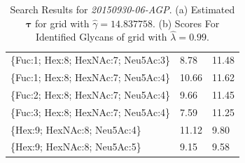 \begin{table}
\begin{minipage}[t]{0.55\linewidth}
\begin{footnotesize}
\begin{tabular}{l|p{2cm} p{2cm}}
\{Fuc:1; Hex:8; HexNAc:7; Neu5Ac:3\} &                 8.78 &              11.48 \\
\{Fuc:1; Hex:8; HexNAc:7; Neu5Ac:4\} &                10.66 &              11.62 \\
\{Fuc:2; Hex:8; HexNAc:7; Neu5Ac:4\} &                 9.66 &              11.45 \\
\{Fuc:3; Hex:8; HexNAc:7; Neu5Ac:4\} &                 7.59 &              11.25 \\
\{Hex:9; HexNAc:8; Neu5Ac:4\}        &                11.12 &               9.80 \\
\{Hex:9; HexNAc:8; Neu5Ac:5\}        &                 9.15 &               9.58 \\
\end{tabular}

    \end{footnotesize}
    
        \end{minipage}
        \caption{
                 Search Results for \textit{20150930-06-AGP}.
                 (a) Estimated $\mathbf{\tau}$ for grid with ${\hat \gamma} = 14.837758$.
                 (b) Scores For Identified Glycans of grid with ${\hat \lambda} = 0.99$.}
        \label{tbl:agp_score_table}
    \end{table}
